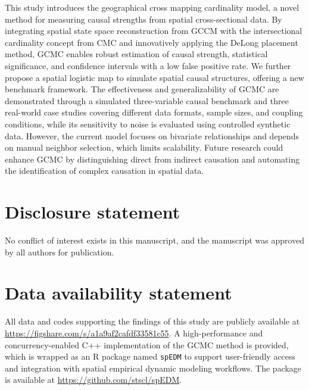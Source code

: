 \documentclass[authoryear,preprint,review,12pt]{elsarticle}
\begin{document}
This study introduces the geographical cross mapping cardinality model, a novel method for measuring causal strengths from spatial cross-sectional data. By integrating spatial state space reconstruction from GCCM with the intersectional cardinality concept from CMC and innovatively applying the DeLong placement method, GCMC enables robust estimation of causal strength, statistical significance, and confidence intervals with a low false positive rate. We further propose a spatial logistic map to simulate spatial causal structures, offering a new benchmark framework. The effectiveness and generalizability of GCMC are demonstrated through a simulated three-variable causal benchmark and three real-world case studies covering different data formats, sample sizes, and coupling conditions, while its sensitivity to noise is evaluated using controlled synthetic data. However, the current model focuses on bivariate relationships and depends on manual neighbor selection, which limits scalability. Future research could enhance GCMC by distinguishing direct from indirect causation and automating the identification of complex causation in spatial data.

\section*{Disclosure statement}

No conflict of interest exists in this manuscript, and the manuscript was approved by all authors for publication.


\section*{Data availability statement}

All data and codes supporting the findings of this study are publicly available at \\
\url{https://figshare.com/s/a1a9af2cafdf33581c55}. A high-performance and concurrency-enabled C++ implementation of the GCMC method is provided, which is wrapped as an R package named \texttt{spEDM} to support user-friendly access and integration with spatial empirical dynamic modeling workflows. The package is available at \url{https://github.com/stscl/spEDM}.


\baselineskip12pt
 
 
\end{document}
